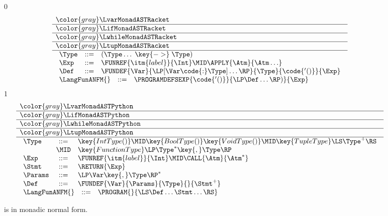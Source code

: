 \documentclass[7x10]{TimesAPriori_MIT}%
\newcommand{\gray}[1]{{\color{gray} #1}}
\def\racketEd{0}
\def\pythonEd{1}
\def\edition{1}
\newcommand{\pythonColor}[0]{}
\numberwithin{theorem}{chapter}
\numberwithin{definition}{chapter}
\numberwithin{equation}{chapter}
\begin{document}
\newcommand{\LfunMonadASTRacket}{
  \begin{array}{lcl}
  \Type &::=& (\Type \ldots \; \key{->}\; \Type) \\
  \Exp &::=& \FUNREF{\itm{label}}{\Int} \MID \APPLY{\Atm}{\Atm\ldots}\\
  \Def &::=& \FUNDEF{\Var}{\LP[\Var \code{:} \Type]\ldots\RP}{\Type}{\code{'()}}{\Exp}
  \end{array}
}

\newcommand{\LfunMonadASTPython}{
  \begin{array}{lcl}
    \Type &::=& \key{IntType()} \MID \key{BoolType()} \key{VoidType()}
        \MID \key{TupleType}\LS\Type^+\RS\\
        &\MID& \key{FunctionType}\LP \Type^{*} \key{, } \Type \RP \\
    \Exp &::=& \FUNREF{\itm{label}}{\Int} \MID \CALL{\Atm}{\Atm^{*}}\\
    \Stmt &::=& \RETURN{\Exp} \\
   \Params &::=&  \LP\Var\key{,}\Type\RP^* \\
   \Def &::=& \FUNDEF{\Var}{\Params}{\Type}{}{\Stmt^{+}} 
  \end{array}
}

\begin{figure}[tp]
\centering
\begin{tcolorbox}[colback=white]
\small
{\if\edition\racketEd    
\[
\begin{array}{l}
  \gray{\LvarMonadASTRacket} \\ \hline
  \gray{\LifMonadASTRacket} \\ \hline
  \gray{\LwhileMonadASTRacket} \\ \hline
  \gray{\LtupMonadASTRacket} \\ \hline
  \LfunMonadASTRacket \\
\begin{array}{rcl}
\LangFunANFM{}  &::=& \PROGRAMDEFSEXP{\code{'()}}{\LP\Def\ldots\RP)}{\Exp}
\end{array}
\end{array}
\]
\fi}
{\if\edition\pythonEd\pythonColor
\[
\begin{array}{l}
  \gray{\LvarMonadASTPython} \\ \hline
  \gray{\LifMonadASTPython} \\ \hline
  \gray{\LwhileMonadASTPython} \\ \hline
  \gray{\LtupMonadASTPython} \\ \hline
  \LfunMonadASTPython \\
  \begin{array}{rcl}
     \LangFunANFM{} &::=& \PROGRAM{}{\LS \Def \ldots \Stmt \ldots \RS}
  \end{array}
\end{array}
\]
\fi}
\end{tcolorbox}

\caption{\LangFunANF{} is \LangFunRef{} in monadic normal form.}
\label{fig:Lfun-anf-syntax}
\end{figure}
\end{document}
